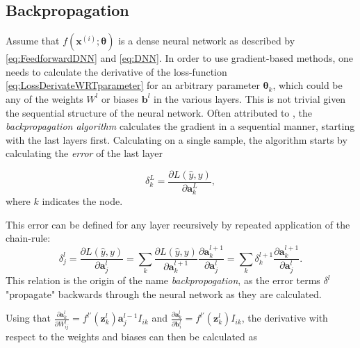 \subsection{Backpropagation}\label{sec:BackpropogationDNN}


Assume that $f(\boldsymbol{x}^{(i)}; \boldsymbol{\theta})$ is a dense neural network as described by \autoref{eq:FeedforwardDNN} and \autoref{eq:DNN}. In order to use gradient-based methods, one needs to calculate the derivative of the loss-function \autoref{eq:LossDerivateWRTparameter} for an arbitrary parameter $\boldsymbol{\theta}_k$, which could be any of the weights $W^l$ or biases $\boldsymbol{b}^l$ in the various layers. This is not trivial given the sequential structure of the neural network. Often attributed to \citet{Rumelhart}, the \emph{backpropagation algorithm} calculates the gradient in a sequential manner, starting with the last layers first. Calculating on a single sample, the algorithm starts by calculating the \emph{error} of the last layer


\begin{equation}\label{eq:lastLayerError}
    \delta^L_k = \frac{\partial L(\hat{y}, y)}{\partial \boldsymbol{a}^L_k},
\end{equation}
where $k$ indicates the node.

This error can be defined for any layer recursively by repeated application of the chain-rule:
\begin{equation}\label{eq:error}
    \delta^l_j = \frac{\partial L(\hat{y}, y)}{\partial \boldsymbol{a}^l_j} 
    = \sum_k \frac{\partial L(\hat{y}, y)}{\partial \boldsymbol{a}^{l+1}_k} \frac{\partial \boldsymbol{a}^{l+1}_k}{\partial \boldsymbol{a}^{l}_j}
    = \sum_k \delta^{l+1}_k \frac{\partial \boldsymbol{a}^{l+1}_k}{\partial \boldsymbol{a}^{l}_j}.
\end{equation}
This relation is the origin of the name \emph{backpropogation}, as the error terms $\delta^l$ "propagate" backwards through the neural network as they are calculated.

Using that 
$\frac{\partial \boldsymbol{a}^{l}_k}{\partial W^l_{ij}} = f^{l\prime}(\boldsymbol{z}^{l}_k)\boldsymbol{a}^{l-1}_j I_{ik}$ 
and 
$\frac{\partial \boldsymbol{a}^{l}_k}{\partial \boldsymbol{b}^l_{i}} = f^{l\prime}(\boldsymbol{z}^{l}_k) I_{ik}$, the derivative with respect to the weights and biases can then be calculated as 

